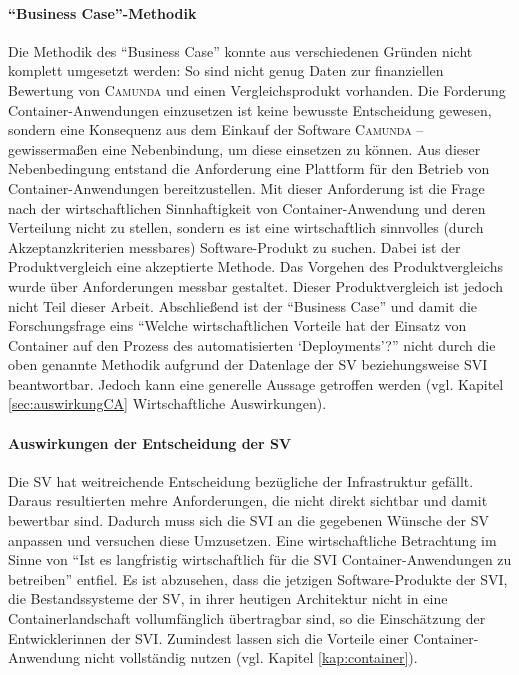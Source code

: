 \paragraph{\enquote{Business Case}-Methodik} Die Methodik des \enquote{Business Case} konnte aus verschiedenen Gründen nicht komplett umgesetzt werden: So sind nicht genug Daten zur finanziellen Bewertung von \textsc{Camunda} und einen Vergleichsprodukt vorhanden. Die Forderung Container-Anwendungen einzusetzen ist keine bewusste Entscheidung gewesen, sondern eine Konsequenz aus dem Einkauf der Software \textsc{Camunda} -- gewissermaßen eine Nebenbindung, um diese einsetzen zu können. Aus dieser Nebenbedingung entstand die Anforderung eine Plattform für den Betrieb von Container-Anwendungen bereitzustellen. Mit dieser Anforderung ist die Frage nach der wirtschaftlichen Sinnhaftigkeit von Container-Anwendung und deren Verteilung nicht zu stellen, sondern es ist eine wirtschaftlich sinnvolles (durch Akzeptanzkriterien messbares) Software-Produkt zu suchen. Dabei ist der Produktvergleich eine akzeptierte Methode. Das Vorgehen des Produktvergleichs wurde über Anforderungen messbar gestaltet. Dieser Produktvergleich ist jedoch nicht Teil dieser Arbeit. Abschließend ist der \enquote{Business Case} und damit die Forschungsfrage eins \enquote{Welche wirtschaftlichen Vorteile hat der Einsatz von Container auf den Prozess des automatisierten \enquote{Deployments}?} nicht durch die oben genannte Methodik aufgrund der Datenlage der \ac{SV} beziehungsweise \ac{SVI} beantwortbar. Jedoch kann eine generelle Aussage getroffen werden (vgl. Kapitel \vref{sec:auswirkungCA} Wirtschaftliche Auswirkungen).

\paragraph{Auswirkungen der Entscheidung der \ac{SV}} Die \ac{SV} hat weitreichende Entscheidung bezügliche der Infrastruktur gefällt. Daraus resultierten mehre Anforderungen, die nicht direkt sichtbar und damit bewertbar sind. Dadurch muss sich die \ac{SVI} an die gegebenen Wünsche der \ac{SV} anpassen und versuchen diese Umzusetzen. Eine wirtschaftliche Betrachtung im Sinne von \enquote{Ist es langfristig wirtschaftlich für die \ac{SVI} Container-Anwendungen zu betreiben} entfiel. Es ist abzusehen, dass die jetzigen Software-Produkte der \ac{SVI}, die Bestandssysteme der \ac{SV}, in ihrer heutigen Architektur nicht in eine Containerlandschaft vollumfänglich übertragbar sind, so die Einschätzung der Entwicklerinnen der \ac{SVI}. Zumindest lassen sich die Vorteile einer Container-Anwendung nicht vollständig nutzen (vgl. Kapitel \vref{kap:container}).

